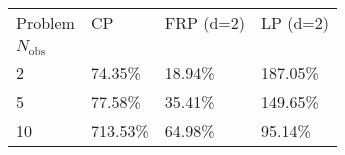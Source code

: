 \begin{tabular}{llll}
Problem & CP & FRP (d=2) & LP (d=2) \\
$N_{{ \text{{obs}} }}$ &  &  &  \\
2 & 74.35\% & 18.94\% & 187.05\% \\
\cline{1-4}
5 & 77.58\% & 35.41\% & 149.65\% \\
\cline{1-4}
10 & 713.53\% & 64.98\% & 95.14\% \\
\cline{1-4}
\end{tabular}
